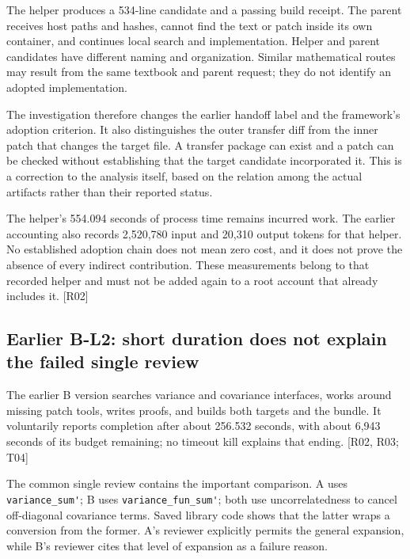The helper produces a 534-line candidate and a passing build receipt. The parent receives host paths and hashes, cannot find the text or patch inside its own container, and continues local search and implementation. Helper and parent candidates have different naming and organization. Similar mathematical routes may result from the same textbook and parent request; they do not identify an adopted implementation.

The investigation therefore changes the earlier handoff label and the framework's adoption criterion. It also distinguishes the outer transfer diff from the inner patch that changes the target file. A transfer package can exist and a patch can be checked without establishing that the target candidate incorporated it. This is a correction to the analysis itself, based on the relation among the actual artifacts rather than their reported status.

The helper's 554.094 seconds of process time remains incurred work. The earlier accounting also records 2,520,780 input and 20,310 output tokens for that helper. No established adoption chain does not mean zero cost, and it does not prove the absence of every indirect contribution. These measurements belong to that recorded helper and must not be added again to a root account that already includes it. [R02]

\subsection[Earlier B-L2: short duration does not explain the failed single review]{\texorpdfstring{\protect\hypertarget{g2}{}Earlier B-L2: short duration does not explain the failed single review}{Earlier B-L2: short duration does not explain the failed single review}}
The earlier B version searches variance and covariance interfaces, works around missing patch tools, writes proofs, and builds both targets and the bundle. It voluntarily reports completion after about 256.532 seconds, with about 6,943 seconds of its budget remaining; no timeout kill explains that ending. [R02, R03; T04]

The common single review contains the important comparison. A uses \nolinkurl{variance_sum'}; B uses \nolinkurl{variance_fun_sum'}; both use uncorrelatedness to cancel off-diagonal covariance terms. Saved library code shows that the latter wraps a conversion from the former. A's reviewer explicitly permits the general expansion, while B's reviewer cites that level of expansion as a failure reason.

